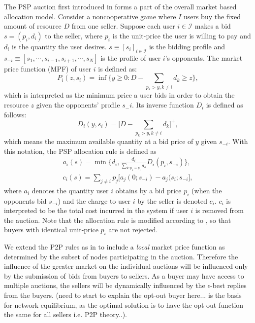 \documentclass[12pt]{article}
\theoremstyle{definition}
\begin{document}
\begin{multicols}{2}
The PSP auction first introduced in \cite{lazar} forms a part of the
overall market based allocation model. Consider a noncooperative game
where $I$ users buy the fixed amount of resource $D$ from one seller. Suppose
each user $i \in \mathcal{I}$ makes a bid $s = (p_i , d_i )$ to the seller,
where $p_i$ is the unit-price the user is willing to pay and $d_i$ is the
quantity the user desires. $s \equiv [s_i]_{i\in\mathcal{I}}$ is the bidding
profile and $s_{−i} \equiv [s_1 , \cdots , s_{i−1} , s_{i+1} , \cdots , s_N]$ is
the profile of user $i$’s opponents. The market price function (MPF) of user $i$ is defined as:
\begin{equation}
    P_i(z, s_i) = \inf\bigg\lbrace y\ge 0 : D - \displaystyle\sum_{p_k>y, k\ne i} d_k
\ge z \bigg\rbrace,
\end{equation}
which is interpreted as the minimum price a user bids in order to obtain the
resource $z$ given the opponents’ profile $s_−i$. Its inverse function $D_i$ is defined as follows:
\begin{equation}
    D_i(y, s_i) = \bigg\lbrack D - \displaystyle\sum_{p_k > y, k\ne i}
d_k\bigg\rbrack^+,
\end{equation}
which means the maximum available quantity at a bid price of $y$ given
$s_{−i}$. With this notation, the PSP allocation rule \cite{tuffin} is defined as
\begin{align}
    a_i(s) = \min\big\lbrace d_i, \frac{d_i}{\sum_{k:p_k=p_i}d_k} D_i(p_i,
s_{-i})\big\rbrace, \\
    c_i(s) = \displaystyle\sum_{j\ne i} p_j \big[a_j(0; s_{-i}) -
a_j(s_i;s_{-i}\big],
\end{align}
where $a_i$ denotes the quantity user $i$ obtains by a bid price $p_i$ (when the
opponents bid $s_{−i}$) and the charge to user $i$ by the seller is denoted
$c_i$. $c_i$ is interpreted to be the total cost incurred in the system if
user $i$ is removed from the auction. Note that the allocation rule is modified
according to \cite{tuffin}, so that buyers with identical unit-price
$p_i$ are not rejected.

We extend the P2P rules as in \cite{semret} to include a \emph{local} market
price function as determined by the subset of nodes participating in the
auction. Therefore the influence of the greater market on the individual
auctions will be influenced only by the submission of bids from buyers to
sellers. As a buyer may have access to multiple auctions, the sellers will be
dynamically influenced by the $\epsilon$-best replies from the buyers. (need to
start to explain the opt-out buyer here... is the basis for network
equilibrium, as the optimal solution is to have the opt-out function the same
for all sellers i.e. P2P theory..).


\end{multicols}
\end{document}
